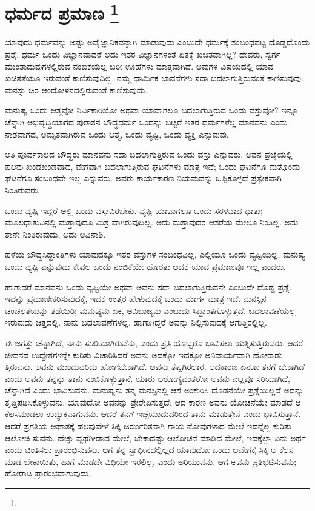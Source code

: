 
\chapter[ಧರ್ಮದ ಪ್ರಮಾಣ ]{ಧರ್ಮದ ಪ್ರಮಾಣ \protect\footnote{}}

ಯಾವುದು ಧರ್ಮವನ್ನು ಅಷ್ಟು ಅವೈಜ್ಞಾನಿಕವನ್ನಾಗಿ ಮಾಡುವುದು ಎಂಬುದೇ ಧರ್ಮಕ್ಕೆ ಸಂಬಂಧಪಟ್ಟ ದೊಡ್ಡದೊಂದು ಪ್ರಶ್ನೆ. ಧರ್ಮ ಒಂದು ವಿಜ್ಞಾನವಾದರೆ ಅದು ಇತರ ವಿಜ್ಞಾನಗಳಂತೆ ಏತಕ್ಕೆ ಖಚಿತವಾಗಿಲ್ಲ? ದೇವರು, ಸ್ವರ್ಗ ಮುಂತಾದುವುಗಳಲ್ಲಿರುವ ನಂಬಿಕೆಯೆಲ್ಲ ಬರೀ ಊಹೆಗಳು ಮಾತ್ರವಾಗಿದೆ. ಅವುಗಳ ವಿಷಯದಲ್ಲಿ ಯಾವ ಖಚಿತತೆಯೂ ಇರುವಂತೆ ಕಾಣಿಸುವುದಿಲ್ಲ. ನಮ್ಮ ಧಾರ್ಮಿಕ ಭಾವನೆಗಳು ಸದಾ ಬದಲಾಗುತ್ತಿರುವಂತೆ ಕಾಣಿಸುವುವು. ಮನಸ್ಸು ಚಿರ ಆಂದೋಳನದಲ್ಲಿರುವಂತೆ ಕಾಣಿಸುವುದು.

ಮನುಷ್ಯ ಒಂದು ಆತ್ಮವೋ ನಿರ್ವಿಕಾರಿಯೋ ಅಥವಾ ಯಾವಾಗಲೂ ಬದಲಾಗುತ್ತಿರುವ ಒಂದು ವಸ್ತುವೋ? ಇನ್ನೂ ಚೆನ್ನಾಗಿ ಅಭಿವೃದ್ಧಿಯಾಗದ ಪುರಾತನ ಬೌದ್ಧಧರ್ಮ ಒಂದನ್ನು ಬಿಟ್ಟರೆ ಇತರ ಧರ್ಮಗಳೆಲ್ಲ ಮಾನವನು ಎಂದು ನಾಶವಾಗದ, ಅಮೃತವಾಗಿರುವ ಒಂದು ಆತ್ಮ, ಒಂದು ವ್ಯಷ್ಟಿ, ಒಂದು ವ್ಯಕ್ತಿ ಎನ್ನುವುವು.

ಅತಿ ಪೂರ್ವಕಾಲದ ಬೌದ್ಧರು ಮಾನವನು ಸದಾ ಬದಲಾಗುತ್ತಿರುವ ಒಂದು ವಸ್ತು ಎನ್ನುವರು. ಅವನ ಪ್ರಜ್ಞೆಯಲ್ಲಿ ಹಲವು ಖಂಡಖಂಡವಾದ, ವೇಗವಾಗಿ ಬದಲಾಗುತ್ತಿರುವ ಘಟನೆಗಳು ಮಾತ್ರ ಇವೆ; ಒಂದು ಘಟನೆಗೂ ಮತ್ತೊಂದು ಘಟನೆಗೂ ಸಂಬಂಧವೇ ಇಲ್ಲ ಎನ್ನುವರು. ಅವರು ಕಾರ್ಯಕಾರಣ ನಿಯಮವನ್ನು ಒಪ್ಪಿಕೊಳ್ಳದೆ ಪ್ರತ್ಯೇಕವಾಗಿ ನಿಂತಿರುವರು.

ಒಂದು ವ್ಯಷ್ಟಿ ಇದ್ದರೆ ಅಲ್ಲಿ ಒಂದು ವಸ್ತುವಿರಬೇಕು. ವ್ಯಷ್ಟಿ ಯಾವಾಗಲೂ ಒಂದು ಸರಳವಾದ ಧಾತು; ಮೂಲಧಾತುವಿನಲ್ಲಿ ಮತ್ತಾವುದೂ ಮಿಶ್ರ ವಾಗಿರುವುದಿಲ್ಲ. ಅದು ಮತ್ತಾವುದರ ಆಸರೆಯ ಮೇಲೂ ನಿಂತಿಲ್ಲ. ಅದು ತಾನೇ ನಿಂತಿರುವುದು, ಅದು ಅವಿನಾಶಿ.

ಹಳೆಯ ಬೌದ್ಧಸಿದ್ಧಾಂತಿಗಳು ಯಾವುದಕ್ಕೂ ಇತರ ವಸ್ತುಗಳ ಸಂಬಂಧವಿಲ್ಲ, ಎಲ್ಲಿಯೂ ಒಂದು ವ್ಯಷ್ಟಿಯಿಲ್ಲ, ಮನುಷ್ಯ ಒಂದು ವ್ಯಷ್ಟಿ ಎನ್ನುವುದು ಕೇವಲ ಒಂದು ನಂಬಿಕೆಯೇ ಹೊರತು ಅದಕ್ಕೆ ಯಾವ ಪ್ರಮಾಣವೂ ಇಲ್ಲ ಎಂದರು.

ಹಾಗಾದರೆ ಮಾನವನು ಒಂದು ವ್ಯಷ್ಟಿಯೇ ಅಥವಾ ಅವನು ಸದಾ ಬದಲಾಗುತ್ತಿರುವನೇ ಎಂಬುದೇ ದೊಡ್ಡ ಪ್ರಶ್ನೆ. ಇದನ್ನು ಪ್ರಮಾಣೀಕರಿಸುವುದಕ್ಕೆ, ಇದಕ್ಕೆ ಉತ್ತರ ಹೇಳುವುದಕ್ಕೆ ಒಂದು ಮಾರ್ಗ ಮಾತ್ರ ಇದೆ. ಮನಸ್ಸಿನ ಚಂಚಲತೆಯನ್ನು ತಡೆಯಿರಿ; ಮನುಷ್ಯನು ಏಕ, ಅವಿಭಾಜ್ಯನು ಎಂಬುದು ಸಿದ್ಧಾಂತಗೊಳ್ಳುತ್ತದೆ. ಬದಲಾವಣೆಯೆಲ್ಲ ಇರುವುದು ಚಿತ್ತದಲ್ಲಿ. ನಾನು ಬದಲಾವಣೆಗಳಲ್ಲ. ಹಾಗಾಗಿದ್ದರೆ ಅವನ್ನು ನಿಲ್ಲಿಸುವುದಕ್ಕೆ ಆಗುತ್ತಿರಲ್ಲಿಲ್ಲ.

ಈ ಜಗತ್ತು ಚೆನ್ನಾಗಿದೆ, ನಾನು ಸುಖಿಯಾಗಿರುವೆನು, ಎಂದು ಪ್ರತಿ ಯೊಬ್ಬರೂ ಭಾವಿಸಲು ಯತ್ನಿಸುತ್ತಿರುವರು. ಆದರೆ ಜೀವನದ ಉದ್ದೇಶಗಳನ್ನೇ ಕುರಿತು ವಿಚಾರಿಸಿದರೆ ಅವನು ಅದಕ್ಕೋ ಇದಕ್ಕೋ ಅನಿವಾರ್ಯವಾಗಿ ಹೋರಾಡು ತ್ತಿರುವನು. ಅವನು ಮುಂದುವರಿದು ಹೋಗಬೇಕಾಗಿದೆ. ಅವನು ತೆಪ್ಪಗಿರಲಾರ. ಆದಕಾರಣ ಏನೋ ತನಗೆ ಬೇಕಾಗಿದೆ ಎಂದು ಅವನು ತನ್ನನ್ನು ತಾನು ನಂಬಿಕೊಳ್ಳುತ್ತಾನೆ. ಯಾರು ಆರೋಗ್ಯವಂತರೋ ಅವನು ಎಲ್ಲವೂ ಸರಿಯಾಗಿದೆ, ಚೆನ್ನಾಗಿದೆ ಎಂದು ಭಾವಿಸುವನು. ಮನುಷ್ಯನು ತನ್ನ ಮನಸ್ಸಿನಲ್ಲಿ ಆಸೆ ಅಂಕುರಿಸಿ ದೊಡನೆಯೇ ಪ್ರಶ್ನೆಯಿಲ್ಲದೆ ಅದನ್ನು ತೃಪ್ತಿಪಡಿಸಿಕೊಳ್ಳುವನು. ಯಾವುದೋ ಅವನನ್ನು ಪ್ರೇರೇಪಿಸುತ್ತದೆ; ಆದ ಕಾರಣ ಅವನು ಯೋಚನೆಯೇ ಮಾಡದೆ ಆ ಕೆಲಸಮಾಡಲು ಉದ್ಯುಕ್ತನಾಗುವನು. ಆದರೆ ತನಗೆ ಇಚ್ಛೆಯಾದುದರಿಂದ ತಾನು ಮಾಡುತ್ತೇನೆ ಎಂದು ಭಾವಿಸುತ್ತಾನೆ. ಆದರೆ ಪ್ರಗತಿಯ ಆಘಾತಕ್ಕೆ ಹಲವುವೇಳೆ ಸಿಕ್ಕಿ ಜರ್ಝರಿತನಾಗಿ ಗಾಯ ನೋವುಗಳಾದ ಮೇಲೆ ಇದನ್ನೆಲ್ಲ ಕುರಿತು ಆಲೋಚಿ ಸುವನು. ಹೆಚ್ಚು ವ್ಯಥೆಗೀಡಾದ ಮೇಲೆ, ಬೇಕಾದಷ್ಟು ಆಲೋಚನೆ ಮಾಡಿದ ಮೇಲೆ, ಇದಕ್ಕೆಲ್ಲಾ ಏನು ಅರ್ಥ ಎಂದು ಚಿಂತಿಸಲು ಪ್ರಾರಂಭಿಸುವನು. ಆಗ ತನ್ನ ಸ್ವಾಧೀನದಲ್ಲಿಲ್ಲದ ಯಾವುದೋ ಒಂದು ಆವೇಗಕ್ಕೆ ಸಿಕ್ಕಿ ಆ ಕೆಲಸ ಮಾಡ ಬೇಕಾಯಿತು, ಹಾಗೆ ಮಾಡದೇ ವಿಧಿಯೇ ಇರಲಿಲ್ಲ, ಎಂದು ಅರಿಯುವನು. ಆಗ ಅವನು ಪ್ರತಿಭಟಿಸುವನು; ಹೋರಾಟ ಪ್ರಾರಂಭವಾಗುವುದು.

